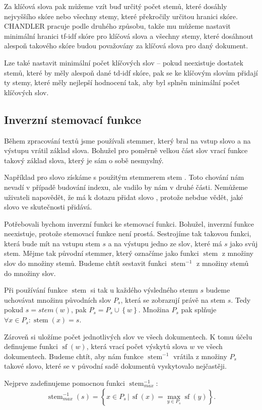 \documentclass[12pt]{article}
\newcommand{\name}{CHANDLER}
\newcommand{\sep}{\,|\,}
\newcommand{\ssection}[1]{\subsection{#1}}
\newcommand{\adds}[1]{\left\{#1\right\}}
\DeclareMathOperator{\stem}{stem}
\DeclareMathOperator{\wcount}{sf}
\newcommand{\invstem}{\stem^{-1}}
\begin{document}
Za klíčová slova pak můžeme vzít buď určitý počet stemů, které dosáhly nejvyššího skóre nebo všechny stemy, které překročily určitou hranici skóre. \name{} pracuje podle druhého způsobu, takže mu můžeme nastavit minimální hranici tf-idf skóre pro klíčová slova a všechny stemy, které dosáhnout alespoň takového skóre budou považovány za klíčová slova pro daný dokument. 

Lze také nastavit minimální počet klíčových slov -- pokud neexistuje dostatek stemů, které by měly alespoň dané td-idf skóre, pak se ke klíčovým slovům přidají ty stemy, které měly nejlepší hodnocení tak, aby byl splněn minimální počet klíčových slov. 

\ssection{Inverzní stemovací funkce}

Během zpracování textů jsme používali stemmer, který bral na vstup slovo a na výstupu vrátil základ slova. Bohužel pro poměrně velkou část slov vrací funkce takový základ slova, který je sám o sobě nesmyslný. 

Například pro slovo  získáme s použitým stemmerem stem . Toto chování nám nevadí v případě budování indexu, ale vadilo by nám v druhé části. Nemůžeme uživateli napovědět, že má k dotazu přidat slovo , protože nebdue vědět, jaké slovo ve skutečnosti přidává. 

Potřebovali bychom inverzní funkci ke stemovací funkci. Bohužel, inverzní funkce neexistuje, protože stemovací funkce není prostá. Sestrojíme tak takovou funkci, která bude mít na vstupu stem $s$ a na výstupu jedno ze slov, které má $s$ jako svůj stem. Mějme tak původní stemmer, který označíme jako funkci $\stem$ z množiny slov do množiny stemů. Budeme chtít sestavit funkci $\invstem$ z množiny stemů do množiny slov.

Při používání funkce $\stem$ si tak u každého výsledného stemu $s$ budeme uchovávat množinu původních slov $P_s$, která se zobrazují právě na stem $s$. Tedy pokud $s=stem(w)$, pak $P_s=P_s\cup\adds{w}$. Množina $P_s$ pak splňuje $\forall x\in P_s: \stem(x)=s$. 

Zároveň si uložíme počet jednotlivých slov ve všech dokumentech. K tomu účelu definujeme funkci $\wcount(w)$, která vrací počet výskytů slova $w$ ve všech dokumentech. Budeme chtít, aby nám funkce $\invstem$ vrátila z množiny $P_s$ takové slovo, které se v původní sadě dokumentů vyskytovalo nejčastěji. 

Nejprve zadefinujeme pomocnou funkci $\invstem_{max}$:
$$\invstem_{max}(s)=\adds{x\in P_s \sep \wcount(x) = \max_{y\in P_s}\wcount(y)}.$$
\end{document}
